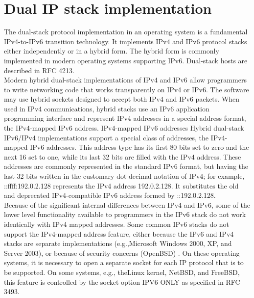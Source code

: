 \documentclass[12pt]{article}
\begin{document}
\section{Dual IP stack implementation}
The dual-stack protocol implementation in an operating system is a fundamental IPv4-to-IPv6 transition technology. It implements IPv4 and IPv6 protocol stacks either independently or in a hybrid form. The hybrid form is commonly implemented in modern operating systems supporting IPv6. Dual-stack hosts are described in RFC 4213.\\
Modern hybrid dual-stack implementations of IPv4 and IPv6 allow programmers to write networking code that works transparently on IPv4 or IPv6. The software may use hybrid sockets designed to accept both IPv4 and IPv6 packets. When used in IPv4 communications, hybrid stacks use an IPv6 application programming interface and represent IPv4 addresses in a special address format, the IPv4-mapped IPv6 address.
IPv4-mapped IPv6 addresses
Hybrid dual-stack IPv6/IPv4 implementations support a special class of addresses, the IPv4-mapped IPv6 addresses. This address type has its first 80 bits set to zero and the next 16 set to one, while its last 32 bits are filled with the IPv4 address. These addresses are commonly represented in the standard IPv6 format, but having the last 32 bits written in the customary dot-decimal notation of IPv4; for example, ::ffff:192.0.2.128 represents the IPv4 address 192.0.2.128. It substitutes the old and deprecated IPv4-compatible IPv6 address formed by ::192.0.2.128.\\
Because of the significant internal differences between IPv4 and IPv6, some of the lower level functionality available to programmers in the IPv6 stack do not work identically with IPv4 mapped addresses. Some common IPv6 stacks do not support the IPv4-mapped address feature, either because the IPv6 and IPv4 stacks are separate implementations (e.g.,Microsoft Windows 2000, XP, and Server 2003), or because of security concerns (OpenBSD) . On these operating systems, it is necessary to open a separate socket for each IP protocol that is to be supported. On some systems, e.g., theLinux kernel, NetBSD, and FreeBSD, this feature is controlled by the socket option IPV6 ONLY as specified in RFC 3493.
\end{document}
